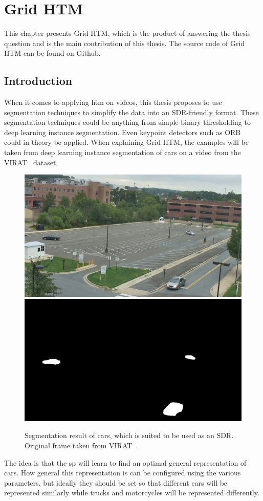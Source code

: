 \chapter{Grid HTM}
\label{sec:grid_htm}
This chapter presents Grid HTM, which is the product of answering the thesis question and is the main contribution of this thesis. The source code of Grid HTM can be found on Github\cite{master_thesis_github}.
\section{Introduction}
\par
When it comes to applying \gls*{htm} on videos, this thesis proposes to use segmentation techniques to simplify the data into an SDR-friendly format. These segmentation techniques could be anything from simple binary thresholding to deep learning instance segmentation. Even keypoint detectors such as ORB~\cite{orb_detector} could in theory be applied. When explaining Grid HTM, the examples will be taken from deep learning instance segmentation of cars on a video from the VIRAT~\cite{VIRAT} dataset.
\begin{figure}[H]
    \centering
    \includegraphics[width=.45\textwidth]{resources/methodology/original.png}
    \includegraphics[width=.45\textwidth]{resources/methodology/car_segmentation.png}
    \caption[Segmentation Result of Cars]{Segmentation result of cars, which is suited to be used as an SDR. Original frame taken from VIRAT~\cite{VIRAT}.}
\end{figure}
The idea is that the \gls*{sp} will learn to find an optimal general representation of cars. How general this representation is can be configured using the various parameters, but ideally they should be set so that different cars will be represented similarly while trucks and motorcycles will be represented differently.
